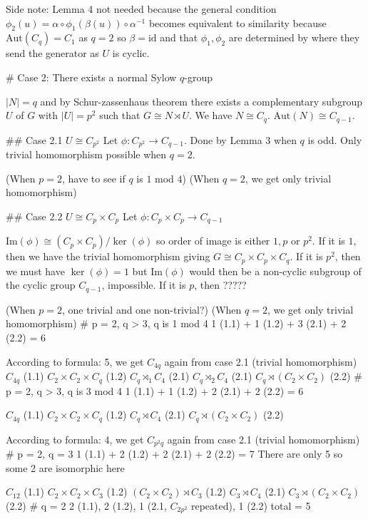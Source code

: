 Side note: Lemma 4 not needed because the general condition $\phi_2(u) = \alpha \circ \phi_1(\beta(u)) \circ \alpha^{-1}$ becomes equivalent to similarity because $\text{Aut}(C_q) = C_1$ as $q = 2$ so $\beta = \text{id}$ and that $\phi_1, \phi_2$ are determined by where they send the generator as $U$ is cyclic.

# Case 2: There exists a normal Sylow $q$-group

$|N| = q$ and by Schur-zassenhaus theorem there exists a complementary subgroup $U$ of $G$ with $|U| = p^2$ such that $G \cong N \rtimes U$. We have $N \cong C_q$. $\text{Aut}(N) \cong C_{q-1}$.

## Case 2.1 $U \cong C_{p^2}$
Let $\phi : C_{p^2} \rightarrow C_{q-1}$. Done by Lemma 3 when $q$ is odd. Only trivial homomorphism possible when $q = 2$.

(When $p = 2$, have to see if $q$ is $1$ mod $4$)
(When $q = 2$, we get only trivial homomorphism)

## Case 2.2 $U \cong C_p \times C_p$
Let $\phi : C_p \times C_p \rightarrow C_{q-1}$

$\text{Im}(\phi) \cong (C_p \times C_p) / \ker(\phi)$ so order of image is either $1, p$ or $p^2$. If it is $1$, then we have the trivial homomorphism giving $G \cong C_p \times C_p \times C_{q}$. If it is $p^2$, then we must have $\ker(\phi) = 1$ but $\text{Im}(\phi)$ would then be a non-cyclic subgroup of the cyclic group $C_{q-1}$, impossible. If it is $p$, then ?????

(When $p = 2$, one trivial and one non-trivial?)
(When $q = 2$, we get only trivial homomorphism)
# p = 2, q > 3, q is 1 mod 4
1 (1.1) + 1 (1.2) + 3 (2.1) + 2 (2.2) = 6

According to formula: 5, we get $C_{4q}$ again from case 2.1 (trivial homomorphism)
$C_{4q}$ (1.1)
$C_2 \times C_2 \times C_q$ (1.2)
$C_q \rtimes_1 C_4$ (2.1)
$C_q \rtimes_2 C_4$ (2.1)
$C_q \rtimes (C_2 \times C_2)$ (2.2)
# p = 2, q > 3, q is 3 mod 4
1 (1.1) + 1 (1.2) + 2 (2.1) + 2 (2.2) = 6

$C_{4q}$ (1.1)
$C_2 \times C_2 \times C_q$ (1.2)
$C_q \rtimes C_4$ (2.1)
$C_q \rtimes (C_2 \times C_2)$ (2.2)

According to formula: 4, we get $C_{p^2 q}$ again from case 2.1 (trivial homomorphism)
# p = 2, q = 3
1 (1.1) + 2 (1.2) + 2 (2.1) + 2 (2.2) = 7
There are only 5 so some 2 are isomorphic here

$C_{12}$ (1.1)
$C_2 \times C_2 \times C_3$ (1.2)
$(C_2 \times C_2) \rtimes C_3$ (1.2)
$C_3 \rtimes C_4$ (2.1)
$C_3 \rtimes (C_2 \times C_2)$ (2.2)
# q = 2
2 (1.1), 2 (1.2), 1 (2.1, $C_{2p^2}$ repeated), 1 (2.2) total = 5